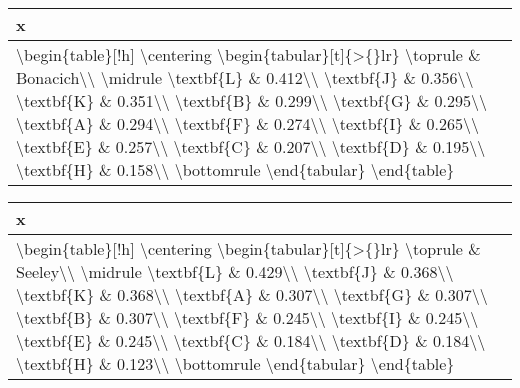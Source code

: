 \begin{table}

\centering
\begin{tabular}[t]{l}
\hline
x\\
\hline
\textbackslash{}begin\{table\}[!h]
\textbackslash{}centering
\textbackslash{}begin\{tabular\}[t]\{>\{\}lr\}
\textbackslash{}toprule
  \& Bonacich\textbackslash{}\textbackslash{}
\textbackslash{}midrule
\textbackslash{}textbf\{L\} \& 0.412\textbackslash{}\textbackslash{}
\textbackslash{}textbf\{J\} \& 0.356\textbackslash{}\textbackslash{}
\textbackslash{}textbf\{K\} \& 0.351\textbackslash{}\textbackslash{}
\textbackslash{}textbf\{B\} \& 0.299\textbackslash{}\textbackslash{}
\textbackslash{}textbf\{G\} \& 0.295\textbackslash{}\textbackslash{}
\textbackslash{}textbf\{A\} \& 0.294\textbackslash{}\textbackslash{}
\textbackslash{}textbf\{F\} \& 0.274\textbackslash{}\textbackslash{}
\textbackslash{}textbf\{I\} \& 0.265\textbackslash{}\textbackslash{}
\textbackslash{}textbf\{E\} \& 0.257\textbackslash{}\textbackslash{}
\textbackslash{}textbf\{C\} \& 0.207\textbackslash{}\textbackslash{}
\textbackslash{}textbf\{D\} \& 0.195\textbackslash{}\textbackslash{}
\textbackslash{}textbf\{H\} \& 0.158\textbackslash{}\textbackslash{}
\textbackslash{}bottomrule
\textbackslash{}end\{tabular\}
\textbackslash{}end\{table\}\\
\hline
\end{tabular}
\centering
\begin{tabular}[t]{l}
\hline
x\\
\hline
\textbackslash{}begin\{table\}[!h]
\textbackslash{}centering
\textbackslash{}begin\{tabular\}[t]\{>\{\}lr\}
\textbackslash{}toprule
  \& Seeley\textbackslash{}\textbackslash{}
\textbackslash{}midrule
\textbackslash{}textbf\{L\} \& 0.429\textbackslash{}\textbackslash{}
\textbackslash{}textbf\{J\} \& 0.368\textbackslash{}\textbackslash{}
\textbackslash{}textbf\{K\} \& 0.368\textbackslash{}\textbackslash{}
\textbackslash{}textbf\{A\} \& 0.307\textbackslash{}\textbackslash{}
\textbackslash{}textbf\{G\} \& 0.307\textbackslash{}\textbackslash{}
\textbackslash{}textbf\{B\} \& 0.307\textbackslash{}\textbackslash{}
\textbackslash{}textbf\{F\} \& 0.245\textbackslash{}\textbackslash{}
\textbackslash{}textbf\{I\} \& 0.245\textbackslash{}\textbackslash{}
\textbackslash{}textbf\{E\} \& 0.245\textbackslash{}\textbackslash{}
\textbackslash{}textbf\{C\} \& 0.184\textbackslash{}\textbackslash{}
\textbackslash{}textbf\{D\} \& 0.184\textbackslash{}\textbackslash{}
\textbackslash{}textbf\{H\} \& 0.123\textbackslash{}\textbackslash{}
\textbackslash{}bottomrule
\textbackslash{}end\{tabular\}
\textbackslash{}end\{table\}\\
\hline
\end{tabular}
\end{table}
